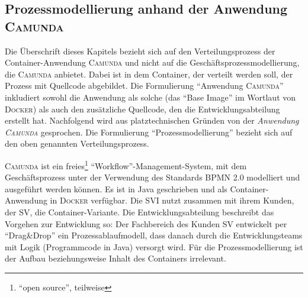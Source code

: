 \subsection{Prozessmodellierung anhand der Anwendung \textsc{Camunda}}
Die Überschrift dieses Kapitels bezieht sich auf den Verteilungsprozess der Container-Anwendung \textsc{Camunda} und nicht auf die Geschäftsprozessmodellierung, die \textsc{Camunda} anbietet. Dabei ist in dem Container, der verteilt werden soll, der Prozess mit Quellcode abgebildet. Die Formulierung \enquote{Anwendung \textsc{Camunda}} inkludiert sowohl die Anwendung als solche (das \enquote{Base Image} im Wortlaut von \textsc{Docker}) als auch den zusätzliche Quellcode, den die Entwicklungsabteilung erstellt hat. Nachfolgend wird aus platztechnischen Gründen von der \textit{Anwendung \textsc{Camunda}} gesprochen. Die Formulierung \enquote{Prozessmodellierung} bezieht sich auf den oben genannten Verteilungsprozess.
\par
\textsc{Camunda} ist ein freies\footnote{\enquote{open source}, teilweise} \enquote{Workflow}-Management-System, mit dem Geschäftsprozess unter der Verwendung des Standards BPMN 2.0\autocite{object_management_group_omg_business_2011} modelliert und ausgeführt werden können.\autocite[vgl.][]{camunda_services_gmbh_workflow_2020} Es ist in Java geschrieben und als Container-Anwendung in \textsc{Docker} verfügbar. Die \ac{SVI} nutzt zusammen mit ihrem Kunden, der \ac{SV}, die Container-Variante. Die Entwicklungsabteilung beschreibt das Vorgehen zur Entwicklung so: Der Fachbereich des Kunden \ac{SV} entwickelt per \enquote{Drag\&Drop} ein Prozessablaufmodell, dass danach durch die Entwicklungsteams mit Logik (Programmcode in Java) versorgt wird. Für die Prozessmodellierung ist der Aufbau beziehungsweise Inhalt des Containers irrelevant. 
\par
